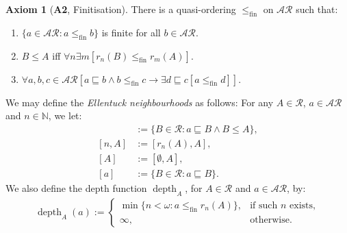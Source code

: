 \documentclass[11pt,reqno]{amsart}
\theoremstyle{plain}
\numberwithin{equation}{section}
\theoremstyle{definition}
\newtheorem*{axiom}{Axiom}
\newcommand{\func}{\operatorname}
\newcommand{\N}{\mathbb{N}}
\newcommand{\cal}{\mathcal}
\newcommand{\depth}{\func{depth}}
\newcommand{\fin}{\mathrm{fin}}
\begin{document}
\begin{axiom}[\textbf{A2}, Finitisation]
    There is a quasi-ordering $\leq_\fin$ on $\cal{AR}$ such that:
    \begin{enumerate}[label=(\arabic*)]
        \item $\{a \in \cal{AR} : a \leq_\fin b\}$ is finite for all $b \in \cal{AR}$.

        \item $B \leq A$ iff $\forall n \exists m [r_n(B) \leq_\fin r_m(A)]$.

        \item $\forall a,b,c \in \cal{AR}[a \sqsubseteq b \wedge b \leq_\fin c \to \exists d \sqsubseteq c[a \leq_\fin d]]$.
    \end{enumerate}
\end{axiom}

We may define the \emph{Ellentuck neighbourhoods} as follows: For any $A \in \cal{R}$, $a \in \cal{AR}$ and $n \in \N$, we let:
\begin{align*}
    [a,A] &:= \{B \in \cal{R} : a \sqsubseteq B \wedge B \leq A\}, \\
    [n,A] &:= [r_n(A),A], \\
    [A] &:= [\emptyset,A], \\
    [a] &:= \{B \in \cal{R} : a \sqsubseteq B\}.
\end{align*}
We also define the depth function $\depth_A$, for $A \in \cal{R}$ and $a \in \cal{AR}$, by:
\begin{align*}
    \depth_A(a) := 
    \begin{cases}
        \min\{n < \omega : a \leq_\fin r_n(A)\}, &\text{if such $n$ exists}, \\
        \infty, &\text{otherwise}.
    \end{cases}
\end{align*}
\end{document}
